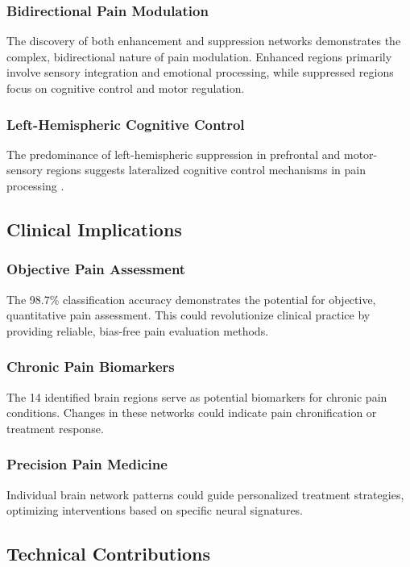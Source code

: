 \documentclass[10pt,journal,compsoc]{IEEEtran}
\begin{document}
\subsubsection{Bidirectional Pain Modulation}
The discovery of both enhancement and suppression networks demonstrates the complex, bidirectional nature of pain modulation. Enhanced regions primarily involve sensory integration and emotional processing, while suppressed regions focus on cognitive control and motor regulation.

\subsubsection{Left-Hemispheric Cognitive Control}
The predominance of left-hemispheric suppression in prefrontal and motor-sensory regions suggests lateralized cognitive control mechanisms in pain processing \cite{lateralization_pain_2023}.

\subsection{Clinical Implications}

\subsubsection{Objective Pain Assessment}
The 98.7\% classification accuracy demonstrates the potential for objective, quantitative pain assessment. This could revolutionize clinical practice by providing reliable, bias-free pain evaluation methods.

\subsubsection{Chronic Pain Biomarkers}
The 14 identified brain regions serve as potential biomarkers for chronic pain conditions. Changes in these networks could indicate pain chronification or treatment response.

\subsubsection{Precision Pain Medicine}
Individual brain network patterns could guide personalized treatment strategies, optimizing interventions based on specific neural signatures.

\subsection{Technical Contributions}
\end{document}
